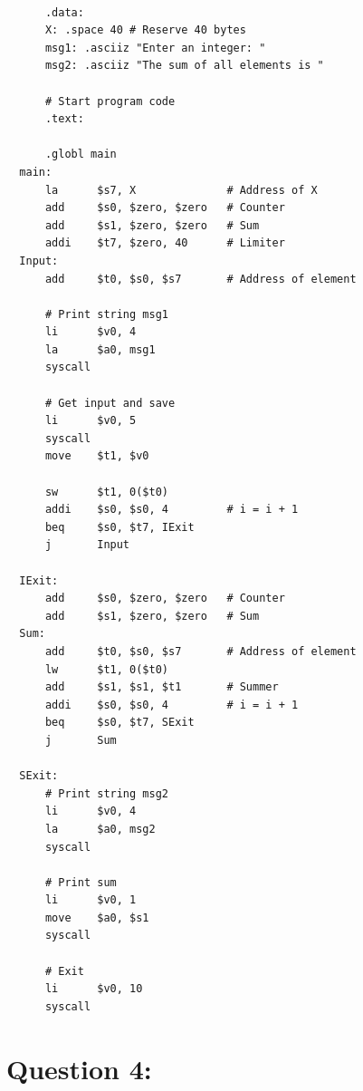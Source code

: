 \documentclass[12pt,a4paper]{article}
\begin{document}
\begin{mdframed}[hidealllines=true,backgroundcolor=magenta!10]
  \begin{lstlisting}

      .data:
      X: .space 40 # Reserve 40 bytes
      msg1: .asciiz "Enter an integer: "
      msg2: .asciiz "The sum of all elements is "

      # Start program code
      .text:

      .globl main
  main:
      la      $s7, X              # Address of X
      add     $s0, $zero, $zero   # Counter
      add     $s1, $zero, $zero   # Sum
      addi    $t7, $zero, 40      # Limiter
  Input:
      add     $t0, $s0, $s7       # Address of element

      # Print string msg1
      li      $v0, 4
      la      $a0, msg1
      syscall

      # Get input and save
      li      $v0, 5
      syscall
      move    $t1, $v0

      sw      $t1, 0($t0)
      addi    $s0, $s0, 4         # i = i + 1
      beq     $s0, $t7, IExit
      j       Input

  IExit:
      add     $s0, $zero, $zero   # Counter
      add     $s1, $zero, $zero   # Sum
  Sum:
      add     $t0, $s0, $s7       # Address of element
      lw      $t1, 0($t0)
      add     $s1, $s1, $t1       # Summer
      addi    $s0, $s0, 4         # i = i + 1
      beq     $s0, $t7, SExit
      j       Sum

  SExit:
      # Print string msg2
      li      $v0, 4
      la      $a0, msg2
      syscall

      # Print sum
      li      $v0, 1
      move    $a0, $s1
      syscall

      # Exit
      li      $v0, 10
      syscall

    \end{lstlisting}
\end{mdframed}


\section*{Question 4:}

\begin{mdframed}[hidealllines=true,backgroundcolor=magenta!10]
  \begin{lstlisting}


    \end{lstlisting}
\end{mdframed}
\end{document}
